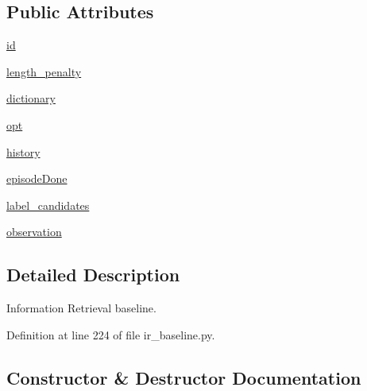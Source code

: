 \subsection*{Public Attributes}
\begin{DoxyCompactItemize}
\item 
\hyperlink{classparlai_1_1agents_1_1ir__baseline_1_1ir__baseline_1_1IrBaselineAgent_afdd605338d0cea9ff8813474b07c21e0}{id}
\item 
\hyperlink{classparlai_1_1agents_1_1ir__baseline_1_1ir__baseline_1_1IrBaselineAgent_a766788ecf47ab2d015b92dc2c9c191e3}{length\+\_\+penalty}
\item 
\hyperlink{classparlai_1_1agents_1_1ir__baseline_1_1ir__baseline_1_1IrBaselineAgent_aedad9637cf632a08f3008765d3debcfa}{dictionary}
\item 
\hyperlink{classparlai_1_1agents_1_1ir__baseline_1_1ir__baseline_1_1IrBaselineAgent_a2c83d3c7e15884871dbfabea9f110933}{opt}
\item 
\hyperlink{classparlai_1_1agents_1_1ir__baseline_1_1ir__baseline_1_1IrBaselineAgent_a8644e518e11536f13338eafcda213d0c}{history}
\item 
\hyperlink{classparlai_1_1agents_1_1ir__baseline_1_1ir__baseline_1_1IrBaselineAgent_ae7e51422143ac04c563c6af1d777a564}{episode\+Done}
\item 
\hyperlink{classparlai_1_1agents_1_1ir__baseline_1_1ir__baseline_1_1IrBaselineAgent_aa7619e8bcb4c75322f0ce7ac9a6cb860}{label\+\_\+candidates}
\item 
\hyperlink{classparlai_1_1agents_1_1ir__baseline_1_1ir__baseline_1_1IrBaselineAgent_a5bc444602ee2228fd3340a5c6a5615d8}{observation}
\end{DoxyCompactItemize}


\subsection{Detailed Description}
\begin{DoxyVerb}Information Retrieval baseline.
\end{DoxyVerb}
 

Definition at line 224 of file ir\+\_\+baseline.\+py.



\subsection{Constructor \& Destructor Documentation}
\mbox{\label{classparlai_1_1agents_1_1ir__baseline_1_1ir__baseline_1_1IrBaselineAgent_a7c734ad9e54fd95fc080e9e51f7a7bbc}} 
